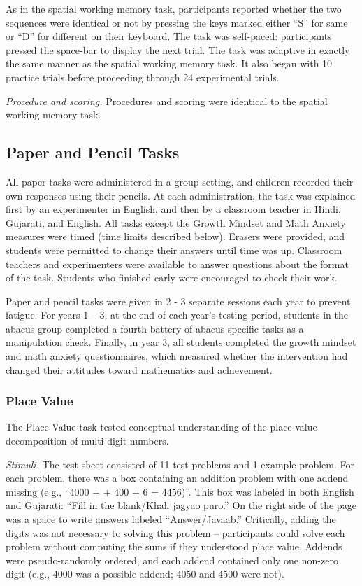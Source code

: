 \documentclass[11pt]{article}
\begin{document}
As in the spatial working memory task, participants reported whether the two sequences were identical or not by pressing the keys marked either ``S'' for same or ``D'' for different on their keyboard. The task was self-paced: participants pressed the space-bar to display the next trial. The task was adaptive in exactly the same manner as the spatial working memory task. It also began with 10 practice trials before proceeding through 24 experimental trials.

{\it Procedure and scoring.} Procedures and scoring were identical to the spatial working memory task.

\subsection{Paper and Pencil Tasks}

All paper tasks were administered in a group setting, and children recorded their own responses using their pencils. At each administration, the task was explained first by an experimenter in English, and then by a classroom teacher in Hindi, Gujarati, and English. All tasks except the Growth Mindset and Math Anxiety measures were timed (time limits described below). Erasers were provided, and students were permitted to change their answers until time was up. Classroom teachers and experimenters were available to answer questions about the format of the task. Students who finished early were encouraged to check their work. 

Paper and pencil tasks were given in 2 - 3 separate sessions each year to prevent fatigue. For years 1 -- 3, at the end of each year's testing period, students in the abacus group completed a fourth battery of abacus-specific tasks as a manipulation check. Finally, in year 3, all students completed the growth mindset and math anxiety questionnaires, which measured whether the intervention had changed their attitudes toward mathematics and achievement.

\subsubsection{Place Value}

The Place Value task tested conceptual understanding of the place value decomposition of multi-digit numbers.

{\it Stimuli.}  The test sheet consisted of 11 test problems and 1 example problem. For each problem, there was a box containing an addition problem with one addend missing (e.g., ``4000 + \underline{\hspace{1cm}} + 400 + 6 = 4456)''. This box was labeled in both English and Gujarati: “Fill in the blank/Khali jagyao puro.” On the right side of the page was a space to write answers labeled “Answer/Javaab.” Critically, adding the digits was not necessary to solving this problem -- participants could solve each problem without computing the sums if they understood place value. Addends were pseudo-randomly ordered, and each addend contained only one non-zero digit (e.g., 4000 was a possible addend; 4050 and 4500 were not). 
\end{document}
